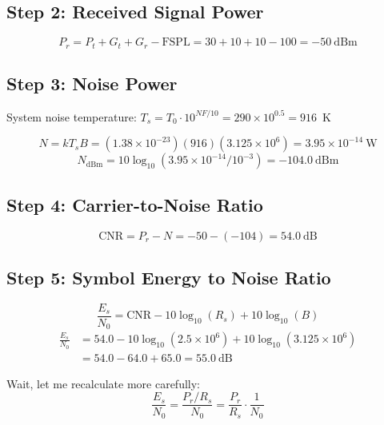 \subsection*{Step 2: Received Signal Power}

\begin{equation}
P_r = P_t + G_t + G_r - \mathrm{FSPL} = 30 + 10 + 10 - 100 = -50~\text{dBm}
\end{equation}

\subsection*{Step 3: Noise Power}

System noise temperature: $T_s = T_0 \cdot 10^{NF/10} = 290 \times 10^{0.5} = 916$~K

\begin{equation}
N = kT_sB = (1.38 \times 10^{-23})(916)(3.125 \times 10^6) = 3.95 \times 10^{-14}~\text{W}
\end{equation}
\begin{equation}
N_{\text{dBm}} = 10\log_{10}(3.95 \times 10^{-14} / 10^{-3}) = -104.0~\text{dBm}
\end{equation}

\subsection*{Step 4: Carrier-to-Noise Ratio}

\begin{equation}
\mathrm{CNR} = P_r - N = -50 - (-104) = 54.0~\text{dB}
\end{equation}

\subsection*{Step 5: Symbol Energy to Noise Ratio}

\begin{equation}
\frac{E_s}{N_0} = \mathrm{CNR} - 10\log_{10}(R_s) + 10\log_{10}(B)
\end{equation}
\begin{align}
\frac{E_s}{N_0} &= 54.0 - 10\log_{10}(2.5 \times 10^6) + 10\log_{10}(3.125 \times 10^6) \nonumber\\
&= 54.0 - 64.0 + 65.0 = 55.0~\text{dB}
\end{align}

Wait, let me recalculate more carefully:
\begin{equation}
\frac{E_s}{N_0} = \frac{P_r/R_s}{N_0} = \frac{P_r}{R_s} \cdot \frac{1}{N_0}
\end{equation}

